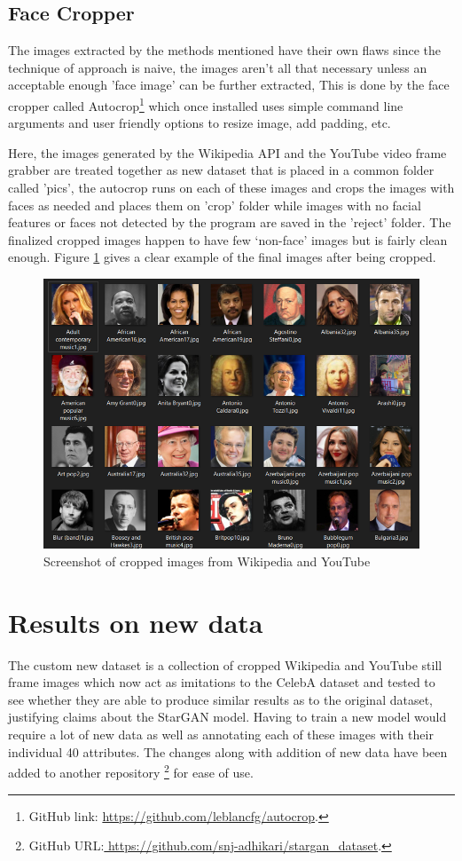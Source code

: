 \documentclass[preprint,12pt]{elsarticle}
\begin{document}
\subsection{Face Cropper}

The images extracted by the methods mentioned have their own flaws since the technique of approach is naive, the images aren't all that necessary unless an acceptable enough 'face image' can be further extracted, This is done by the face cropper called Autocrop\footnote{GitHub link: \url{https://github.com/leblancfg/autocrop}.} which once installed uses simple command line arguments and user friendly options to resize image, add padding, etc. 

Here, the images generated by the Wikipedia API and the YouTube video frame grabber are treated together as new dataset that is placed in a common folder called 'pics', the autocrop runs on each of these images and crops the images with faces as needed and places them on 'crop' folder while images with no facial features or faces not detected by the program are saved in the 'reject' folder. The finalized cropped images happen to have few ‘non-face’ images but is fairly clean enough. Figure \ref{fig:Cropped} gives a clear example of the final images after being cropped.

\begin{figure}[ht]
\centering\includegraphics[width=0.7\linewidth]{cropped.png}
\caption{Screenshot of cropped images from Wikipedia and YouTube}
\label{fig:Cropped}
\end{figure}

\section{Results on new data}
\label{S:5}

The custom new dataset is a collection of cropped Wikipedia and YouTube still frame images which now act as imitations to the CelebA dataset and tested to see whether they are able to produce similar results as to the original dataset, justifying claims about the StarGAN model. Having to train a new model would require a lot of new data as well as annotating each of these images with their individual 40 attributes. The changes along with addition of new data have been added to another repository \footnote{GitHub URL:\url{ https://github.com/snj-adhikari/stargan_dataset}.} for ease of use.
\end{document}
